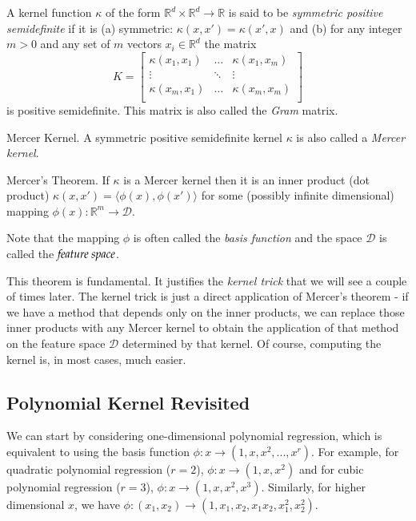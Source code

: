 \begin{refsection}
A kernel function $\kappa$ of the form $\mathbb{R}^d \times \mathbb{R}^d \rightarrow \mathbb{R}$ is said to be \textit{symmetric positive semidefinite} if it is (a) symmetric: $\kappa(x, x') = \kappa(x', x)$ and (b) for any integer $m > 0$ and any set of $m$ vectors $x_i \in \mathbb{R}^d$ the matrix
%
$$ K = 
\begin{bmatrix} 
    \kappa(x_1,x_1) & \hdots & \kappa(x_1,x_m) \\
    \vdots & \ddots & \vdots \\
    \kappa(x_m,x_1) & \hdots & \kappa(x_m,x_m) \\
\end{bmatrix} $$
is positive semidefinite. This matrix is also called the \emph{Gram} matrix.

\begin{definition}{Mercer Kernel.}
A symmetric positive semidefinite kernel $\kappa$ is also called a \emph{Mercer kernel}.
\end{definition}

\begin{definition}{Mercer's Theorem.}
If $\kappa$ is a Mercer kernel then it is an inner product (dot product) $\kappa(x, x') = \langle\phi(x), \phi(x')\rangle$ for some (possibly infinite dimensional) mapping $\phi(x): \mathbb{R}^m \rightarrow \mathcal{D}$.
\end{definition}

Note that the mapping $\phi$ is often called the \emph{basis function} and the space $\mathcal{D}$ is called the $\emph{feature space}$.

This theorem is fundamental. It justifies the \emph{kernel trick} that we will see a couple of times later. The kernel trick is just a direct application of Mercer's theorem - if we have a method that depends only on the inner products, we can replace those inner products with any Mercer kernel to obtain the application of that method on the feature space $\mathcal{D}$ determined by that kernel. Of course, computing the kernel is, in most cases, much easier.


\subsection*{Polynomial Kernel Revisited}

We can start by considering one-dimensional polynomial regression, which is equivalent to using the basis function $\phi: x \rightarrow (1, x, x^2, ..., x^r)$. For example, for quadratic polynomial regression ($r = 2$), $\phi: x \rightarrow (1, x, x^2)$ and for cubic polynomial regression ($r = 3$), $\phi: x \rightarrow (1, x, x^2, x^3)$. Similarly, for higher dimensional $x$, we have $\phi: (x_1, x_2) \rightarrow (1, x_1, x_2, x_1x_2, x_1^2, x_2^2)$.


\end{refsection}
